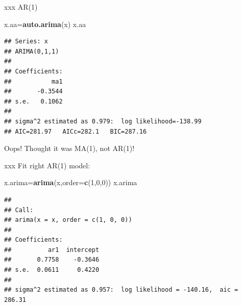 \documentclass[ignorenonframetext,]{beamer}
\newenvironment{Shaded}{\begin{snugshade}}{\end{snugshade}}
\newcommand{\DataTypeTok}[1]{\textcolor[rgb]{0.13,0.29,0.53}{#1}}
\newcommand{\DecValTok}[1]{\textcolor[rgb]{0.00,0.00,0.81}{#1}}
\newcommand{\KeywordTok}[1]{\textcolor[rgb]{0.13,0.29,0.53}{\textbf{#1}}}
\newcommand{\NormalTok}[1]{#1}
\begin{document}
\begin{frame}[fragile]{xxx AR(1)}
\protect\hypertarget{xxx-ar1}{}

\begin{Shaded}
\begin{Highlighting}[]
\NormalTok{x.aa=}\KeywordTok{auto.arima}\NormalTok{(x)}
\NormalTok{x.aa}
\end{Highlighting}
\end{Shaded}

\begin{verbatim}
## Series: x 
## ARIMA(0,1,1) 
## 
## Coefficients:
##           ma1
##       -0.3544
## s.e.   0.1062
## 
## sigma^2 estimated as 0.979:  log likelihood=-138.99
## AIC=281.97   AICc=282.1   BIC=287.16
\end{verbatim}

Oops! Thought it was MA(1), not AR(1)!

\end{frame}

\begin{frame}[fragile]{xxx Fit right AR(1) model:}
\protect\hypertarget{xxx-fit-right-ar1-model}{}

\begin{Shaded}
\begin{Highlighting}[]
\NormalTok{x.arima=}\KeywordTok{arima}\NormalTok{(x,}\DataTypeTok{order=}\KeywordTok{c}\NormalTok{(}\DecValTok{1}\NormalTok{,}\DecValTok{0}\NormalTok{,}\DecValTok{0}\NormalTok{))}
\NormalTok{x.arima}
\end{Highlighting}
\end{Shaded}

\begin{verbatim}
## 
## Call:
## arima(x = x, order = c(1, 0, 0))
## 
## Coefficients:
##          ar1  intercept
##       0.7758    -0.3646
## s.e.  0.0611     0.4220
## 
## sigma^2 estimated as 0.957:  log likelihood = -140.16,  aic = 286.31
\end{verbatim}

\end{frame}
\end{document}

